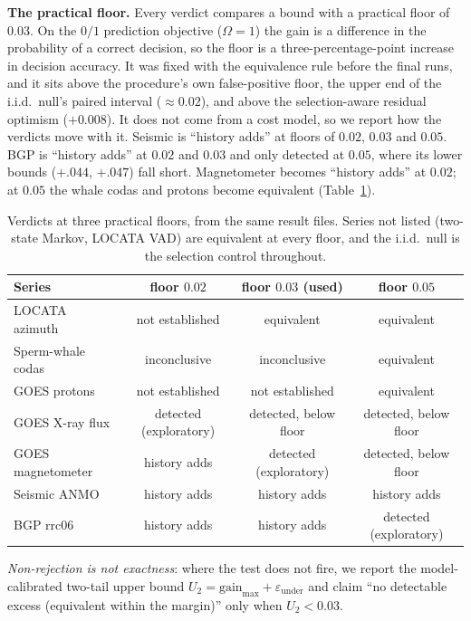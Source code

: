 \documentclass[11pt]{article}
\begin{document}
\textbf{The practical floor.} Every verdict compares a bound with a
practical floor of $0.03$. On the $0/1$ prediction objective ($\Omega=1$)
the gain is a difference in the probability of a correct decision, so the
floor is a three-percentage-point increase in decision accuracy. It was
fixed with the equivalence rule before the final runs, and it sits above
the procedure's own false-positive floor, the upper end of the i.i.d.\ null's
paired interval ($\approx0.02$), and above the selection-aware residual
optimism ($+0.008$). It does not come from a cost model, so
we report how the verdicts move with it. Seismic is ``history adds'' at
floors of $0.02$, $0.03$ and $0.05$. BGP is ``history adds'' at $0.02$ and
$0.03$ and only detected at $0.05$, where its lower bounds ($+.044$,
$+.047$) fall short. Magnetometer becomes ``history adds'' at $0.02$; at
$0.05$ the whale codas and protons become equivalent (Table~\ref{tab:floor}).

\begin{table}[h]\centering\footnotesize
\begin{tabular}{lccc}
\toprule
Series & floor $0.02$ & floor $0.03$ (used) & floor $0.05$ \\
\midrule
LOCATA azimuth & not established & equivalent & equivalent \\
Sperm-whale codas & inconclusive & inconclusive & equivalent \\
GOES protons & not established & not established & equivalent \\
GOES X-ray flux & detected (exploratory) & detected, below floor & detected, below floor \\
GOES magnetometer & history adds & detected (exploratory) & detected, below floor \\
Seismic ANMO & history adds & history adds & history adds \\
BGP rrc06 & history adds & history adds & detected (exploratory) \\
\bottomrule
\end{tabular}
\caption{Verdicts at three practical floors, from the same result files.
Series not listed (two-state Markov, LOCATA VAD) are equivalent at every
floor, and the i.i.d.\ null is the selection control throughout.}
\label{tab:floor}
\end{table}

\emph{Non-rejection is not exactness}: where the test does not fire, we
report the model-calibrated two-tail upper bound
$U_2=\text{gain}_{\max}+\varepsilon_{\mathrm{under}}$ and claim ``no
detectable excess (equivalent within the margin)'' only when $U_2<0.03$.
\end{document}
